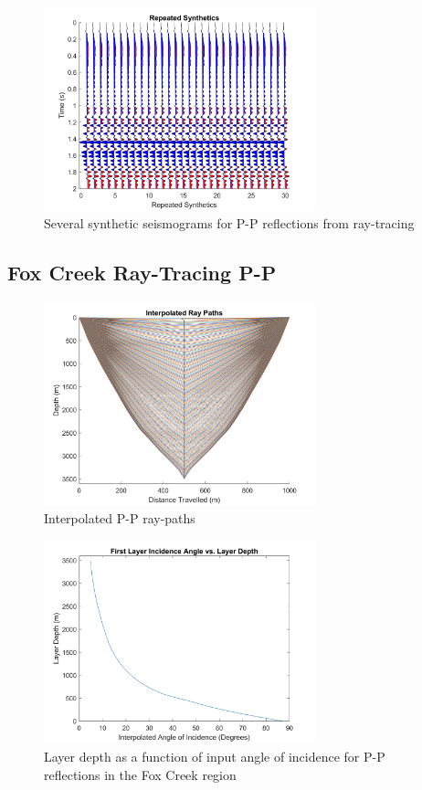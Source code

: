 \documentclass[12pt]{article}
\begin{document}
\begin{figure}[!htb]
	\centering
	\includegraphics[width=0.7\textwidth]{Figures/FDCseveralstackPP.png}
	\caption[Fox Creek ray-tracing several P-P synthetic seismograms]{Several synthetic seismograms for P-P reflections from ray-tracing}
	\label{fig:FDCSeveralStackPP}
\end{figure}
\FloatBarrier
\pagebreak
\subsection{Fox Creek Ray-Tracing P-P}
\begin{figure}[!htb]
	\centering
	\includegraphics[width=0.7\textwidth]{Figures/RTCinterpPP.png}
	\caption[Fox Creek ray-tracing P-P ray-paths]{Interpolated P-P ray-paths}
	\label{fig:RTCinterpPP}
\end{figure}

\begin{figure}[!htb]
	\centering
	\includegraphics[width=0.7\textwidth]{Figures/RTCDvPP.png}
	\caption[Fox Creek ray-tracing P-P depth-angle plot]{Layer depth as a function of input angle of incidence for P-P reflections in the Fox Creek region}
	\label{fig:RTCDvPP}
\end{figure}
\end{document}
